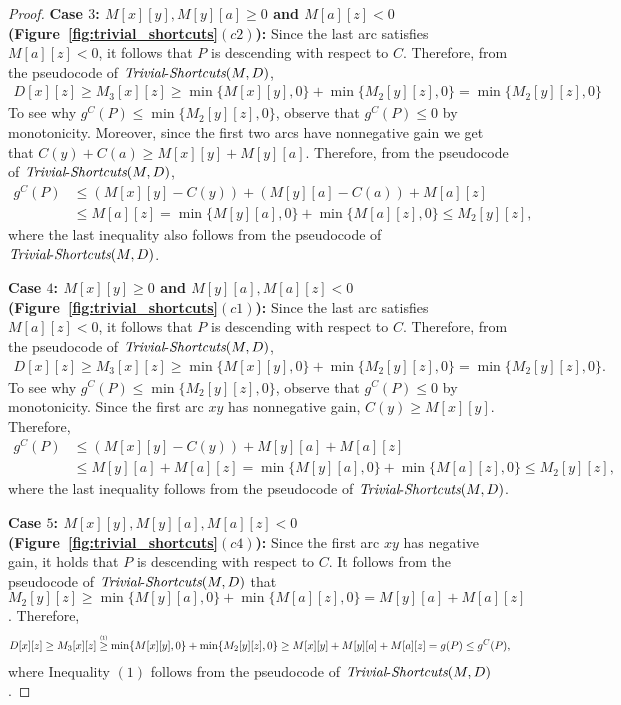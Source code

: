 \documentclass[11pt]{article}
\newcommand{\Trivial}{\mbox{{\it Trivial}-{\it Shortcuts}}}
\newcommand\numge[1]{\stackrel{\scriptscriptstyle(\mkern-1.5mu#1\mkern-1.5mu)}{\ge}}
\begin{document}
\begin{proof}
     \textbf{Case $3$: $M[x][y],M[y][a]\ge 0$ and $M[a][z]< 0$ (Figure~\ref{fig:trivial_shortcuts}$(c2)$):} 
     Since the last arc satisfies $M[a][z]<0$, it follows that $P$ is descending with respect to $C$. Therefore, from the pseudocode of $\Trivial(M,D)$,
     \begin{align*}
      D[x][z] \ge M_3[x][z] \ge \min\{M[x][y],0\} + \min\{M_2[y][z],0\}  = \min\{M_2[y][z],0\}
    \end{align*}
    To see why $g^C(P) \le \min\{M_2[y][z],0\}$, observe that $g^C(P) \le 0$ by monotonicity. Moreover, since the first two arcs have nonnegative gain we get that $C(y) + C(a)\ge M[x][y] + M[y][a]$. Therefore, from the pseudocode of $\Trivial(M,D)$, 
    \begin{align*}
      g^C(P) &\le 
      (M[x][y]-C(y)) + (M[y][a]-C(a)) + M[a][z] \\
      &\le
      M[a][z] = \min\{M[y][a],0\} +  \min\{M[a][z],0\} \le M_2[y][z],
    \end{align*}
    where the last inequality also follows from the pseudocode of $\Trivial(M,D)$.
    

    \textbf{Case $4$: $M[x][y]\ge 0$ and $M[y][a],M[a][z]<0$ (Figure~\ref{fig:trivial_shortcuts}$(c1)$):} 
    Since the last arc satisfies $M[a][z]<0$, it follows that $P$ is descending with respect to $C$. Therefore, from the pseudocode of $\Trivial(M,D)$,
     \begin{align*}
      D[x][z] \ge M_3[x][z] \ge \min\{M[x][y],0\} + \min\{M_2[y][z],0\}  = \min\{M_2[y][z],0\}.
    \end{align*}
    To see why $g^C(P) \le \min\{M_2[y][z],0\}$, observe that $g^C(P) \le 0$ by monotonicity. Since the first arc $xy$ has nonnegative gain, $C(y)\ge M[x][y]$. Therefore, 
    \begin{align*}
      g^C(P) &\le 
      (M[x][y]-C(y)) + M[y][a] + M[a][z] \\
      &\le
      M[y][a] + M[a][z] = \min\{M[y][a],0\} +  \min\{M[a][z],0\} \le M_2[y][z],
    \end{align*}
    where the last inequality follows from the pseudocode of $\Trivial(M,D)$.
    
    \textbf{Case $5$: $M[x][y], M[y][a],M[a][z] < 0$ (Figure~\ref{fig:trivial_shortcuts}$(c4)$):} 
    Since the first arc $xy$ has negative gain, it holds that $P$ is descending with respect to $C$. It follows from the pseudocode of $\Trivial(M,D)$ that $M_2[y][z] \ge \min\{M[y][a],0\} +  \min\{M[a][z],0\}  = M[y][a]+M[a][z]$. Therefore, 
    \begin{align*}
        D[x][z] \ge M_3[x][z] \numge{1} \min\{M[x][y],0\} +  \min\{M_2[y][z],0\} \ge M[x][y]+M[y][a]+M[a][z] = g(P) \le g^C(P),
    \end{align*}
    where Inequality $(1)$ follows from the pseudocode of $\Trivial(M,D)$.


\end{proof}
\end{document}
